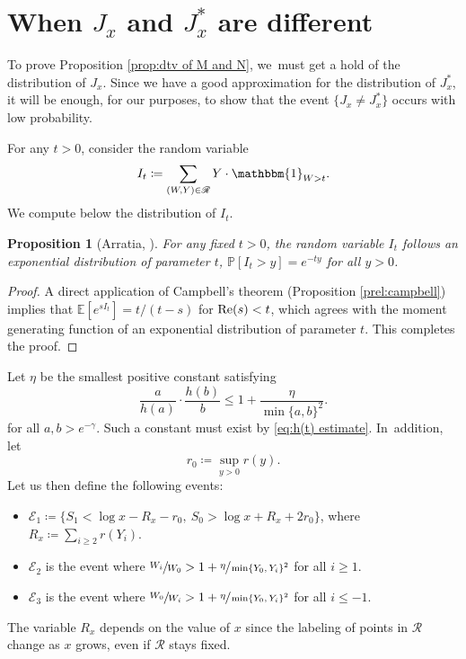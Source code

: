 \documentclass[JEP,XML,SOM,Unicode,published]{cedram}
\newcommand{\PP}{\mathbb{P}}
\newcommand{\EE}{\mathbb{E}}
\newcommand{\one}{\mathbbm{1}}
\newcommand{\EC}{\mathcal{E}}
\newcommand{\RS}{\mathscr{R}}
\newcommand{\prob}[1]{\PP[ #1 ]}
\renewcommand{\Re}{\textup{Re}}
\newcommand{\bg}{\big}
\theoremstyle{plain}
\newtheorem{prop}[cor]{Proposition}
\theoremstyle{definition}
\begin{document}
\section{When \texorpdfstring{$J_x$ and $J_x^*$}{Jxx} are different}
\label{sec:different J and J*}

To prove Proposition \ref{prop:dtv of M and N}, we~must get a hold of the distribution of $J_x$. Since we have a good approximation for the distribution of $J_x^*$, it will be enough, for our purposes, to show that the event $\{J_x\neq J_x^*\}$ occurs with low probability.

For any $t > 0$, consider the random variable
\[
I_t \coloneqq \sum_{(W,Y)\in \RS} Y\cdot \one_{W>t}.
\]
We compute below the distribution of $I_t$.

\begin{prop}[Arratia, \cite{Arratia02}]
\label{prop:icexponential}
For any fixed $t > 0$, the random variable $I_t$ follows an exponential distribution of parameter $t$, \ie $\prob{I_t > y} = e^{-ty}$ for all $y > 0$.
\end{prop}

\begin{proof}
A direct application of Campbell's theorem (Proposition \ref{prel:campbell}) implies that $\EE[e^{sI_t}]=t/(t-s)$ for $\Re(s)<t$, which agrees with the moment generating function of an exponential distribution of parameter $t$. This completes the proof.
\end{proof}

Let $\eta$ be the smallest positive constant satisfying
\[
\frac{a}{h(a)}\cdot \frac{h(b)}{b} \le 1 + \frac{\eta}{\min\{a,b\}^2}.
\]
for all $a, b > e^{-\gamma}$. Such a constant must exist by \eqref{eq:h(t) estimate}. In~addition, let
\[
r_0\coloneqq \sup_{y > 0} r(y).
\]
Let us then define the following events:

\begin{itemize}
\item $\EC_1\coloneqq \bg\{ S_1<\log x-R_x-r_0,\ S_0>\log x+R_x+2r_0\bg\}$, where $R_x\coloneqq \sum_{i\ge2} r(Y_i)$.

\item $\EC_2$ is the event where $\sfrac{W_i}{W_0} > 1 + \sfrac{\eta}{\min\{Y_0,Y_i\}^2}$ for all $i \ge 1$.

\item $\EC_3$ is the event where $\sfrac{W_0}{W_i} > 1 + \sfrac{\eta}{\min\{Y_0,Y_i\}^2}$ for all $i \le -1$.
\end{itemize}
The variable $R_x$ depends on the value of $x$ since the labeling of points in $\mathscr R$ change as $x$ grows, even if $\mathscr R$ stays fixed.
\end{document}
